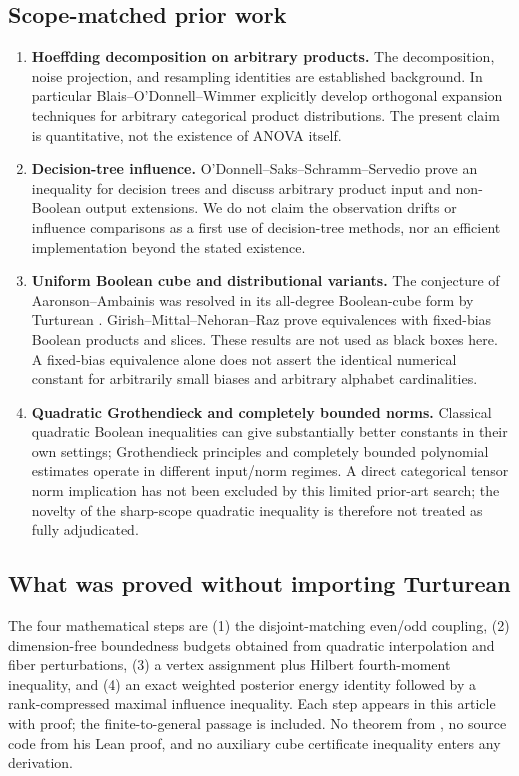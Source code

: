 \documentclass[11pt,letterpaper]{article}
\theoremstyle{definition}
\begin{document}
\subsection{Scope-matched prior work}
\begin{enumerate}[label=\textnormal{(\roman*)}]
\item \textbf{Hoeffding decomposition on arbitrary products.}
The decomposition, noise projection, and resampling identities are
established background. In particular Blais--O'Donnell--Wimmer
\cite{BOW2008} explicitly develop orthogonal expansion techniques
for arbitrary categorical product distributions. The present
claim is quantitative, not the existence of ANOVA itself.
\item \textbf{Decision-tree influence.}
O'Donnell--Saks--Schramm--Servedio \cite{OSSS2005} prove an inequality
for decision trees and discuss arbitrary product input and
non-Boolean output extensions. We do not claim the observation
drifts or influence comparisons as a first use of decision-tree
methods, nor an efficient implementation beyond the stated existence.
\item \textbf{Uniform Boolean cube and distributional variants.}
The conjecture of Aaronson--Ambainis \cite{AA2014} was resolved in
its all-degree Boolean-cube form by Turturean
\cite{Turturean2026}. Girish--Mittal--Nehoran--Raz \cite{GMNR2026}
prove equivalences with fixed-bias Boolean products and slices. These
results are not used as black boxes here. A fixed-bias equivalence
alone does not assert the identical numerical constant for
arbitrarily small biases and arbitrary alphabet cardinalities.
\item \textbf{Quadratic Grothendieck and completely bounded norms.}
Classical quadratic Boolean inequalities can give substantially
better constants in their own settings; Grothendieck principles and
completely bounded polynomial estimates \cite{EG2023,EGSP2026}
operate in different input/norm regimes. A direct categorical tensor
norm implication has not been excluded by this limited prior-art
search; the novelty of the sharp-scope quadratic inequality is
therefore not treated as fully adjudicated.
\end{enumerate}

\subsection{What was proved without importing Turturean}
The four mathematical steps are (1) the disjoint-matching even/odd
coupling, (2) dimension-free boundedness budgets obtained from
quadratic interpolation and fiber perturbations, (3) a vertex
assignment plus Hilbert fourth-moment inequality, and (4) an exact
weighted posterior energy identity followed by a rank-compressed
maximal influence inequality. Each step appears in this article
with proof; the finite-to-general passage is included. No theorem
from \cite{Turturean2026}, no source code from his Lean proof, and
no auxiliary cube certificate inequality enters any derivation.
\end{document}
